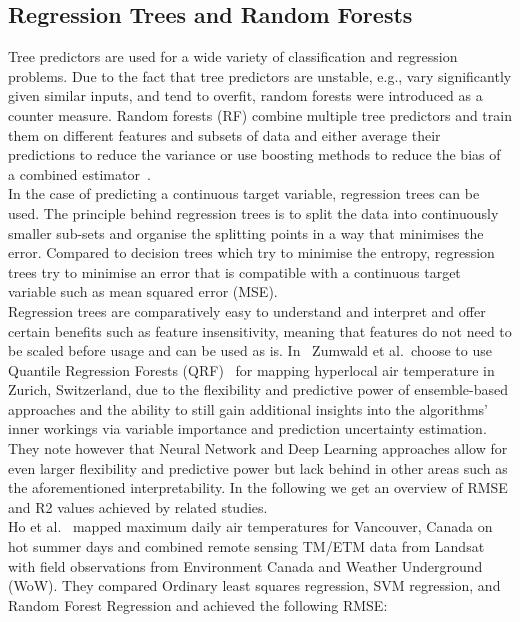 \subsection{Regression Trees and Random Forests}

Tree predictors are used for a wide variety of classification and regression problems. Due to the fact that tree predictors are unstable, e.g., vary significantly given similar inputs, and tend to overfit, random forests were introduced as a counter measure. Random forests (RF) combine multiple tree predictors and train them on different features and subsets of data and either average their predictions to reduce the variance or use boosting methods to reduce the bias of a combined estimator~\cite{breiman2001random}.\\
In the case of predicting a continuous target variable, regression trees can be used. The principle behind regression trees is to split the data into continuously smaller sub-sets and organise the splitting points in a way that minimises the error. Compared to decision trees which try to minimise the entropy, regression trees try to minimise an error that is compatible with a continuous target variable such as mean squared error (MSE).\\
Regression trees are comparatively easy to understand and interpret and offer certain benefits such as feature insensitivity, meaning that features do not need to be scaled before usage and can be used as is. In~\cite{zumwald2021mapping} Zumwald et al.\ choose to use Quantile Regression Forests (QRF)~\cite{meinshausen2006quantile} for mapping hyperlocal air temperature in Zurich, Switzerland, due to the flexibility and predictive power of ensemble-based approaches and the ability to still gain additional insights into the algorithms' inner workings via variable importance and prediction uncertainty estimation. They note however that Neural Network and Deep Learning approaches allow for even larger flexibility and predictive power but lack behind in other areas such as the aforementioned interpretability. In the following we get an overview of RMSE and R2 values achieved by related studies.\\
Ho et al.~\cite{ho2014mapping} mapped maximum daily air temperatures for Vancouver, Canada on hot summer days and combined remote sensing TM/ETM data from Landsat with field observations from Environment Canada and Weather Underground (WoW). They compared Ordinary least squares regression, SVM regression, and Random Forest Regression and achieved the following RMSE:

